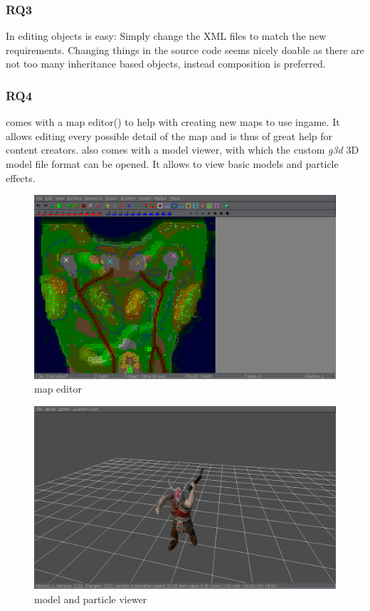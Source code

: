 \subsubsection{RQ3}
In \GLEST{} editing objects is easy: Simply change the XML files to match the new requirements. Changing things in the
source code seems nicely doable as there are not too many inheritance based objects, instead composition is preferred.

\subsubsection{RQ4}
\GLEST{} comes with a map editor() to help with creating new maps to use ingame. It allows editing every possible detail
of the map and is thus of great help for content creators. \GLEST{} also comes with a model viewer, with which the
custom \textit{g3d} 3D model file format can be opened. It allows to view basic models and particle effects.

\begin{figure}[h!]
    \centering
    \includegraphics[width=\textwidth]{pics/glesteditor}
    \caption{\GLEST{} map editor}
    \label{fig:glestmapeditor}
\end{figure}

\begin{figure}[h!]
    \centering
    \includegraphics[width=\textwidth]{pics/glestmodelviewer}
    \caption{\GLEST{} model and particle viewer}
    \label{fig:glestmodelviewer}
\end{figure}

